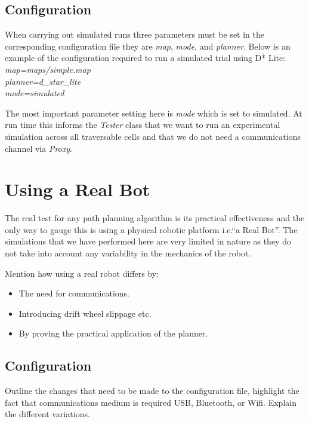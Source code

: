 \subsection{Configuration}
\noindent 
When carrying out simulated runs three parameters must be set in the corresponding configuration file they are \textit{map}, \textit{mode}, and \textit{planner}. Below is an example of the configuration required to run a simulated trial using D* Lite: \\

	\indent \textit{map=maps/simple.map \\}
	\indent \textit{planner=d\_star\_lite \\}
	\indent \textit{mode=simulated \\}

\noindent
The most important parameter setting here is \textit{mode} which is set to simulated. At run time this informs the \textit{Tester} class that we want to run an experimental simulation across all traversable cells and that we do not need a communications channel via \textit{Proxy}.


\section{Using a Real Bot}
\noindent
The real test for any path planning algorithm is its practical effectiveness and the only way to gauge this is using a physical robotic platform i.e.``a Real Bot''. The simulations that we have performed here are very limited in nature as they do not take into account any variability in the mechanics of the robot.
  
Mention how using a real robot differs by:

\begin{itemize}
\item The need for communications.
\item Introducing drift wheel slippage etc.
\item By proving the practical application of the planner.
\end{itemize}

\subsection{Configuration}
Outline the changes that need to be made to the configuration file, highlight the fact that communications medium is required USB, Bluetooth, or Wifi. Explain the different variations.

